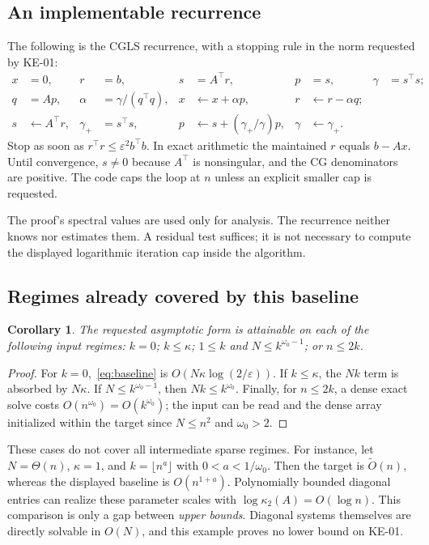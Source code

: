 \documentclass[11pt,a4paper]{article}
\newcommand{\softO}{\widetilde O}
\newcommand{\cond}{\kappa_2}
\newcommand{\eps}{\varepsilon}
\newtheorem{corollary}[theorem]{Corollary}
\theoremstyle{definition}
\theoremstyle{remark}
\begin{document}
\subsection{An implementable recurrence}
The following is the CGLS recurrence, with a stopping rule in the norm requested by KE-01:
\begin{align*}
 x&=0,& r&=b,& s&=A^\top r,& p&=s,& \gamma&=s^\top s;\\
 q&=Ap,& \alpha&=\gamma/(q^\top q),&
 x&\leftarrow x+\alpha p,& r&\leftarrow r-\alpha q;\\
 s&\leftarrow A^\top r,& \gamma_+&=s^\top s,&
 p&\leftarrow s+(\gamma_+/\gamma)p,& \gamma&\leftarrow\gamma_+.
\end{align*}
Stop as soon as $r^\top r\le\eps^2b^\top b$. In exact arithmetic the maintained $r$ equals $b-Ax$. Until convergence, $s\ne0$ because $A^\top$ is nonsingular, and the CG denominators are positive. The code caps the loop at $n$ unless an explicit smaller cap is requested.

The proof's spectral values are used only for analysis. The recurrence neither knows nor estimates them. A residual test suffices; it is not necessary to compute the displayed logarithmic iteration cap inside the algorithm.

\subsection{Regimes already covered by this baseline}
\begin{corollary}
\label{cor:regimes}
The requested asymptotic form is attainable on each of the following input regimes: $k=0$; $k\le\kappa$; $1\le k$ and $N\le k^{\omega_0-1}$; or $n\le2k$.
\end{corollary}
\begin{proof}
For $k=0$,~\eqref{eq:baseline} is $O(N\kappa\log(2/\eps))$. If $k\le\kappa$, the $Nk$ term is absorbed by $N\kappa$. If $N\le k^{\omega_0-1}$, then $Nk\le k^{\omega_0}$. Finally, for $n\le2k$, a dense exact solve costs $O(n^{\omega_0})=O(k^{\omega_0})$; the input can be read and the dense array initialized within the target since $N\le n^2$ and $\omega_0>2$.
\end{proof}

These cases do not cover all intermediate sparse regimes. For instance, let $N=\Theta(n)$, $\kappa=1$, and $k=\lfloor n^a\rfloor$ with $0<a<1/\omega_0$. Then the target is $\softO(n)$, whereas the displayed baseline is $O(n^{1+a})$. Polynomially bounded diagonal entries can realize these parameter scales with $\log\cond(A)=O(\log n)$. This comparison is only a gap between \emph{upper bounds}. Diagonal systems themselves are directly solvable in $O(N)$, and this example proves no lower bound on KE-01.
\end{document}
